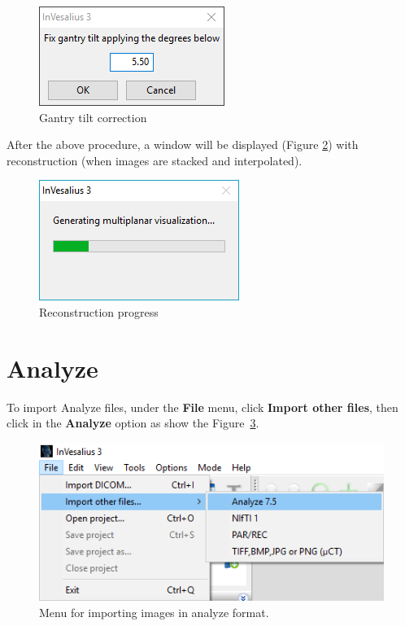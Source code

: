\begin{figure}[!htb]
\centering
\includegraphics[scale=0.75]{../user_guide_figures/invesalius_screen/window_gantry_tilt_en.png}
\caption{Gantry tilt correction}
\label{fig:gantry_tilt}
\end{figure}

After the above procedure, a window will be displayed (Figure \ref{fig:prog_recons}) with reconstruction (when images are stacked and interpolated).

\begin{figure}[!htb]
\centering
\includegraphics[scale=0.6]{../user_guide_figures/invesalius_screen/import_window_progress_en.png} 
\caption{Reconstruction progress}
\label{fig:prog_recons}
\end{figure}

\newpage

\section{Analyze}

To import Analyze files, under the \textbf{File} menu, click \textbf{Import other files}, then click in the \textbf{Analyze} option as show the Figure~\ref{fig:analyze_menu}.

\begin{figure}[!htb]
\centering
\includegraphics[scale=0.4]{../user_guide_figures/invesalius_screen/import_analyze_menu_en.png}
\caption{Menu for importing images in analyze format.}
\label{fig:analyze_menu}
\end{figure}

